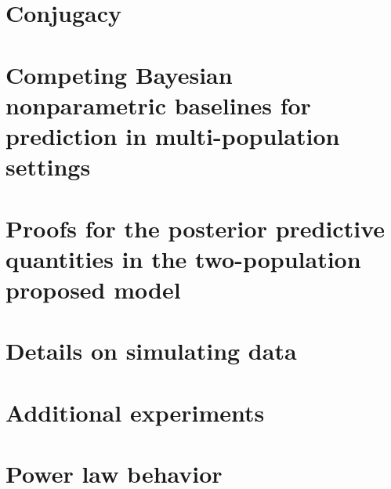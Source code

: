 \documentclass[ba,preprint]{imsart}%
\numberwithin{equation}{section}
\theoremstyle{plain}
\begin{document}
\section{Conjugacy}
\label{app:conjugacy}


\section{Competing Bayesian nonparametric baselines for prediction in multi-population settings}
\label{app:method_for_prediction}


\section{Proofs for the posterior predictive quantities in the two-population proposed model}
\label{app:detail_on_prediction}


\section{Details on simulating data}
\label{app:taking_sample}


\section{Additional experiments}
\label{app:additional_experiments}


\section{Power law behavior}
\label{app:power_law}


\section{}
\label{app:extension}




\end{document}
